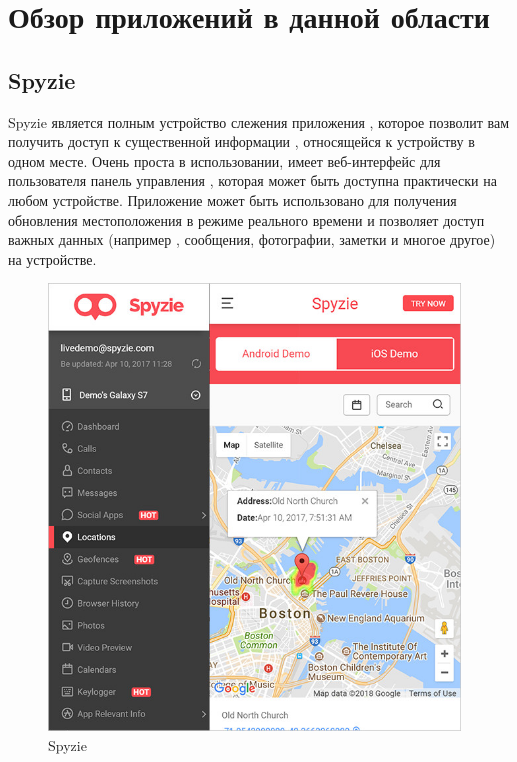 \documentclass[a4paper,12pt]{article}
\begin{document}
\section{Обзор приложений в данной области}

\subsection{Spyzie}

Spyzie является полным устройство слежения приложения ,
 которое позволит вам получить доступ к существенной информации , 
 относящейся к устройству в одном месте. Очень проста в использовании, 
 имеет веб-интерфейс для пользователя панель управления , которая может быть 
 доступна практически на любом устройстве. Приложение может быть использовано для 
 получения обновления местоположения в режиме реального времени и 
 позволяет доступ важных данных (например , сообщения, фотографии, заметки и многое другое) на устройстве.\cite{review5}
 \begin{figure}
 	\centering
 	\includegraphics[width=10.94cm]{images/spy-location.jpg}
 	\caption{Spyzie}
 	\label{fig:card}
 \end{figure}
\end{document}
